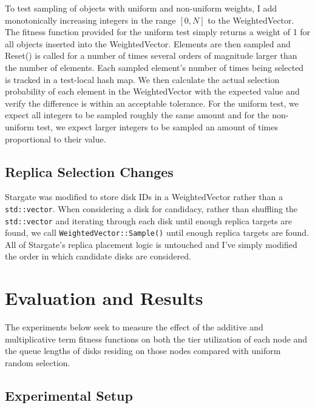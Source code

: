 \documentclass[12pt]{article}
\begin{document}
    To test sampling of objects with uniform and non-uniform weights, I add
    monotonically increasing integers in the range $[0,N]$ to the
    WeightedVector. The fitness function provided for the uniform test simply
    returns a weight of 1 for all objects inserted into the WeightedVector.
    Elements are then sampled and Reset() is called for a number of times
    several orders of magnitude larger than the number of elements. Each
    sampled element's number of times being selected is tracked in a test-local
    hash map. We then calculate the actual selection probability of each
    element in the WeightedVector with the expected value and verify the
    difference is within an acceptable tolerance. For the uniform test, we
    expect all integers to be sampled roughly the same amount and for the
    non-uniform test, we expect larger integers to be sampled an amount of
    times proportional to their value.

  \subsection{Replica Selection Changes}
    
  Stargate was modified to store disk IDs in a WeightedVector rather than a
  \verb|std::vector|. When considering a disk for candidacy, rather than
  shuffling the \verb|std::vector| and iterating through each disk until enough
  replica targets are found, we call \verb|WeightedVector::Sample()| until
  enough replica targets are found. All of Stargate's replica placement logic
  is untouched and I've simply modified the order in which candidate disks are
  considered.
      

\section{Evaluation and Results}

The experiments below seek to measure the effect of the additive and
multiplicative term fitness functions on both the tier utilization of each node
and the queue lengths of disks residing on those nodes compared with uniform
random selection.

  \subsection{Experimental Setup}
\end{document}
